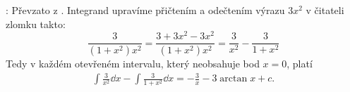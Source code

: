 \begin{mdframed}[style=mdmathsolution]
  [\ref{mai:eq146}]: Převzato z \cite[s.~29]{Knichal}. Integrand upravíme přičtením a
  odečtením výrazu $3x^2$ v čitateli zlomku takto:
  \begin{equation*}
    \frac{3}{(1+x^2)x^2} = \frac{3+3x^2-3x^2}{(1+x^2)x^2} = \frac{3}{x^2}-\frac{3}{1+x^2}  
  \end{equation*}
  Tedy v každém otevřeném intervalu, který neobsahuje bod \(x=0\), platí
  \begin{gather*}
    \int{\frac{3}{x^2}\dd{x}} - \int{\frac{3}{1+x^2}\dd{x}} = -\frac{3}{x}-3\arctan x + c. 
  \end{gather*}
\end{mdframed}